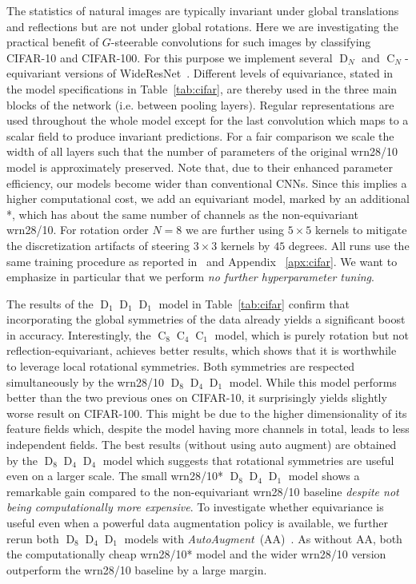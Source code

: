 \documentclass{article}
\newcommand{\apx}{Appendix\xspace
}
\newcommand{\D}[1]{\ensuremath{\operatorname{D}_{#1}}}
\newcommand{\C}[1]{\ensuremath{\operatorname{C}_{#1}}}
\newcommand{\DN}{\ensuremath{\operatorname{D}_{\!N}}}
\newcommand{\CN}{\ensuremath{\operatorname{C}_{\!N}}}
\begin{document}
The statistics of natural images are typically invariant under global translations and reflections but are not under global rotations.
Here we are investigating the practical benefit of $G$-steerable convolutions for such images by classifying CIFAR-10 and CIFAR-100.
For this purpose we implement several $\DN$ and $\CN$-equivariant versions of WideResNet~\cite{widenet}.
Different levels of equivariance, stated in the model specifications in Table~\ref{tab:cifar}, are thereby used in the three main blocks of the network (i.e. between pooling layers).
Regular representations are used throughout the whole model except for the last convolution which maps to a scalar field to produce invariant predictions.
For a fair comparison we scale the width of all layers such that the number of parameters of the original wrn28/10 model is approximately preserved.
Note that, due to their enhanced parameter efficiency, our models become wider than conventional CNNs.
Since this implies a higher computational cost, we add an equivariant model, marked by an additional *, which has about the same number of channels as the non-equivariant wrn28/10.
For rotation order $N=8$ we are further using $5\times5$ kernels to mitigate the discretization artifacts of steering $3\times3$ kernels by $45$ degrees.
All runs use the same training procedure as reported in~\cite{widenet} and \apx~\ref{apx:cifar}.
We want to emphasize in particular that we perform \textit{no further hyperparameter tuning}.

The results of the $\D1\D1\D1$ model in Table~\ref{tab:cifar} confirm that incorporating the global symmetries of the data already yields a significant boost in accuracy.
Interestingly, the $\C8\C4\C1$ model, which is purely rotation but not reflection-equivariant, achieves better results, which shows that it is worthwhile to leverage local rotational symmetries.
Both symmetries are respected simultaneously by the wrn28/10 $\D8\D4\D1$ model.
While this model performs better than the two previous ones on CIFAR-10, it surprisingly yields slightly worse result on CIFAR-100.
This might be due to the higher dimensionality of its feature fields which, despite the model having more channels in total, leads to less independent fields.
The best results (without using auto augment) are obtained by the $\D8\D4\D4$ model which suggests that rotational symmetries are useful even on a larger scale.
The small wrn28/10* $\D8\D4\D1$ model shows a remarkable gain compared to the non-equivariant wrn28/10 baseline \textit{despite not being computationally more expensive}.
To investigate whether equivariance is useful even when a powerful data augmentation policy is available, we further rerun both $\D8\D4\D1$ models with \textit{AutoAugment}~(AA)~\cite{autoaugment}.
As without AA, both the computationally cheap wrn28/10* model and the wider wrn28/10 version outperform the wrn28/10 baseline by a large margin.
\end{document}
